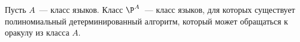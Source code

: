 Пусть $A$~--- класс языков. Класс $\P^{A}$~--- класс языков, для которых существует полиномиальный детерминированный
алгоритм, который может обращаться к оракулу из класса $A$.